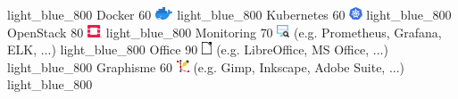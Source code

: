 \documentclass[singlesided,
  paper=a4,
  fontsize=10pt
]{resume}
\begin{document}
{        {light_blue_800}
      \skill%
        {Docker}%
        {60}%
        {\includegraphics[height=1em]{skill/docker.png}}%
        {}%
        {light_blue_800}
      \skill%
        {Kubernetes}%
        {60}%
        {\includegraphics[height=1em]{skill/kubernetes.png}}%
        {}%
        {light_blue_800}
      \skill%
        {OpenStack}%
        {80}%
        {\includegraphics[height=1em]{skill/openstack.png}}%
        {}%
        {light_blue_800}
      \skill%
        {Monitoring}%
        {70}%
        {\includegraphics[height=1em]{skill/monitoring.png}}%
        {(e.g. Prometheus, Grafana, ELK, ...)}%
        {light_blue_800}
      \skill%
        {Office}%
        {90}%
        {\includegraphics[height=1em]{skill/office.png}}%
        {(e.g. LibreOffice, MS Office, ...)}%
        {light_blue_800}
      \skill%
        {Graphisme}%
        {60}%
        {\includegraphics[height=1em]{skill/graphism.png}}%
        {(e.g. Gimp, Inkscape, Adobe Suite, ...)}%
        {light_blue_800}
}
\end{document}
